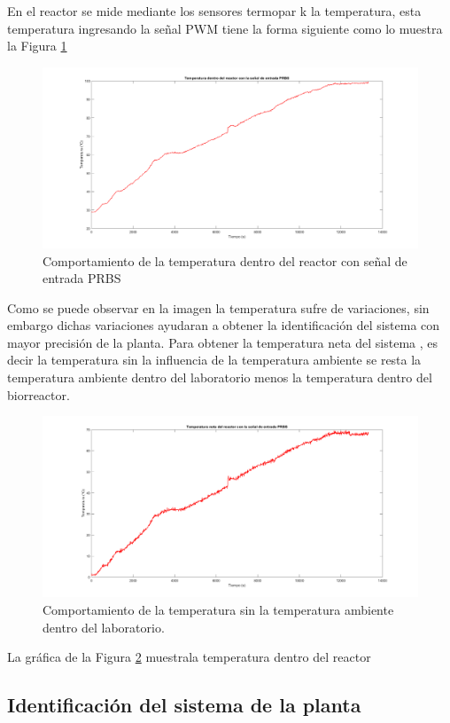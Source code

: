\documentclass[12pt]{article}
\begin{document}
	En el reactor se mide mediante los sensores termopar k  la temperatura, esta temperatura ingresando la señal PWM tiene la forma siguiente como lo muestra la Figura \ref{ Temperatura_con PRBS}
	
	\begin{figure}[H]
		\centering
		\includegraphics[width=.8\linewidth]{imagenes/temperatura con prbs}
		\caption{Comportamiento de la temperatura dentro del reactor con señal de entrada PRBS }
		\label{ Temperatura_con PRBS}
	\end{figure}
	
	
	Como se puede observar en la imagen la temperatura sufre de variaciones,  sin embargo dichas variaciones ayudaran a obtener la identificación del sistema con mayor precisión de la planta.
	Para obtener la temperatura neta del sistema , es decir la temperatura sin la influencia de la temperatura ambiente se resta la temperatura ambiente dentro del laboratorio menos la temperatura dentro del biorreactor.
	
	\begin{figure}[h!]
		\centering
		\includegraphics[width=.7\linewidth]{imagenes/temp_neta}
		\caption{Comportamiento de la temperatura sin la temperatura ambiente dentro del laboratorio. }
		\label{ Temperatura neta_con PRBS}
	\end{figure}
	
	La gráfica de la Figura \ref{ Temperatura neta_con PRBS} muestrala temperatura dentro del reactor 
	
	
	
	\subsection{Identificación del sistema de la planta}	
	
\end{document}
